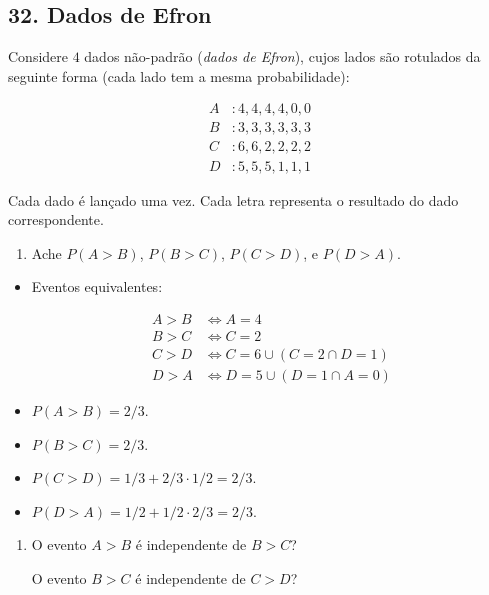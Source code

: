 \documentclass[
  11pt]{report}
\providecommand{\tightlist}{%
  \setlength{\itemsep}{0pt}\setlength{\parskip}{0pt}}
\begin{document}
\hypertarget{dados-de-efron}{%
\subsection*{32. Dados de Efron}\label{dados-de-efron}}

\begin{rmdbox}

Considere $4$ dados não-padrão (\emph{dados de Efron}), cujos lados são rotulados da seguinte forma (cada lado tem a mesma probabilidade):

\[
\begin{aligned}
  A &: 4, 4, 4, 4, 0, 0 \\
  B &: 3, 3, 3, 3, 3, 3 \\
  C &: 6, 6, 2, 2, 2, 2 \\
  D &: 5, 5, 5, 1, 1, 1
\end{aligned}
\]

Cada dado é lançado uma vez. Cada letra representa o resultado do dado correspondente.

\begin{enumerate}
\def\labelenumi{\alph{enumi}.}
\tightlist
\item
  Ache $P(A > B)$, $P(B > C)$, $P(C > D)$, e $P(D > A)$.
\end{enumerate}

\end{rmdbox}

\begin{itemize}
\item
  Eventos equivalentes:

  \[
  \begin{aligned}
    A > B &\iff A = 4 \\
    B > C &\iff C = 2 \\
    C > D &\iff C = 6 \cup (C = 2 \cap D = 1) \\
    D > A & \iff D = 5 \cup (D = 1\cap A = 0)
  \end{aligned}
  \]
\item
  $P(A > B) = 2/3$.
\item
  $P(B > C) = 2/3$.
\item
  $P(C > D) = 1/3 + 2/3 \cdot 1/2 = 2/3$.
\item
  $P(D > A) = 1/2 + 1/2 \cdot 2/3 = 2/3$.
\end{itemize}

\begin{rmdbox}

\begin{enumerate}
\def\labelenumi{\alph{enumi}.}
\setcounter{enumi}{1}
\item
  O evento $A > B$ é independente de $B > C$?

  O evento $B > C$ é independente de $C > D$?
\end{enumerate}

\end{rmdbox}
\end{document}
